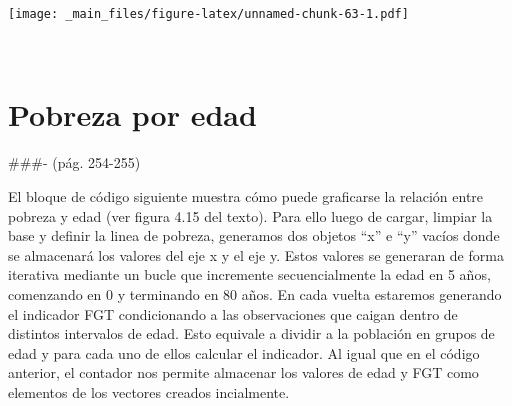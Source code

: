 \documentclass[
]{book}
\begin{document}
\texttt{[image: \_main\_files/figure-latex/unnamed-chunk-63-1.pdf]}

~

\hypertarget{pobreza-por-edad}{%
\section{Pobreza por edad}\label{pobreza-por-edad}}

\#\#\#- (pág. 254-255)

El bloque de código siguiente muestra cómo puede graficarse la relación entre pobreza y edad (ver figura 4.15 del texto). Para ello luego de cargar, limpiar la base y definir la linea de pobreza, generamos dos objetos ``x'' e ``y'' vacíos donde se almacenará los valores del eje x y el eje y. Estos valores se generaran de forma iterativa mediante un bucle que incremente secuencialmente la edad en 5 años, comenzando en 0 y terminando en 80 años. En cada vuelta estaremos generando el indicador FGT condicionando a las observaciones que caigan dentro de distintos intervalos de edad. Esto equivale a dividir a la población en grupos de edad y para cada uno de ellos calcular el indicador. Al igual que en el código anterior, el contador nos permite almacenar los valores de edad y FGT como elementos de los vectores creados incialmente.
\end{document}
